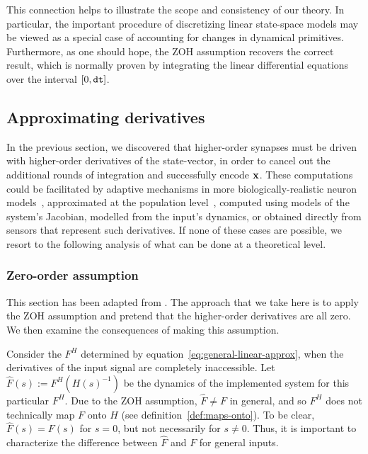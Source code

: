 This connection helps to illustrate the scope and consistency of our theory.
In particular, the important procedure of discretizing linear state-space models may be viewed as a special case of accounting for changes in dynamical primitives.
Furthermore, as one should hope, the ZOH assumption recovers the correct result, which is normally proven by integrating the linear differential equations over the interval $[0\text{,}\, \texttt{dt}{}]$.

\subsection{Approximating derivatives}
\label{sec:derivatives}

In the previous section, we discovered that higher-order synapses must be driven with higher-order derivatives of the state-vector, in order to cancel out the additional rounds of integration and successfully encode $\mathbf{x}$. 
These computations could be facilitated by adaptive mechanisms in more biologically-realistic neuron models~\citep{lundstrom2008fractional}, approximated at the population level~\citep{tripp2010}, computed using models of the system's Jacobian, modelled from the input's dynamics, or obtained directly from sensors that represent such derivatives.
If none of these cases are possible, we resort to the following analysis of what can be done at a theoretical level. 

\subsubsection{Zero-order assumption}

This section has been adapted from \citet[][appendix~A.4]{voelker2018}.
The approach that we take here is to apply the ZOH assumption and pretend that the higher-order derivatives are all zero.
We then examine the consequences of making this assumption.

Consider the $F^H$ determined by equation~\ref{eq:general-linear-approx}, when the derivatives of the input signal are completely inaccessible.
Let $\hat{F}(s) := F^{H}(H(s)^{-1})$ be the dynamics of the implemented system for this particular $F^H$.
Due to the ZOH assumption, $\hat{F} \ne F$ in general, and so $F^H$ does not technically map $F$ onto $H$ (see definition~\ref{def:maps-onto}).
To be clear, $\hat{F}(s) = F(s)$ for $s = 0$, but not necessarily for $s \ne 0$.
Thus, it is important to characterize the difference between $\hat{F}$ and $F$ for general inputs.

